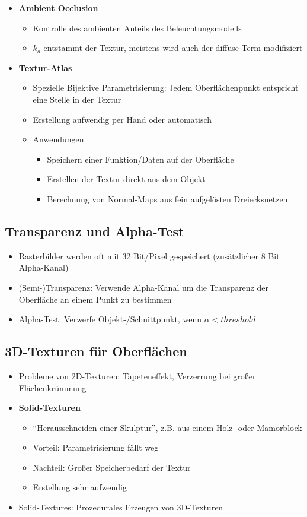 \begin{itemize}
	\item \textbf{Ambient Occlusion}
	\begin{itemize}
		\item Kontrolle des ambienten Anteils des Beleuchtungsmodells
		\item \(k_a\) entstammt der Textur, meistens wird auch der diffuse Term modifiziert
	\end{itemize}
	\item \textbf{Textur-Atlas}
	\begin{itemize}
		\item Spezielle Bijektive Parametrisierung: Jedem Oberflächenpunkt entspricht eine Stelle in der Textur
		\item Erstellung aufwendig per Hand oder automatisch
		\item Anwendungen
		\begin{itemize}
			\item Speichern einer Funktion/Daten auf der Oberfläche
			\item Erstellen der Textur direkt aus dem Objekt
			\item Berechnung von Normal-Maps aus fein aufgelösten Dreiecksnetzen
		\end{itemize}
	\end{itemize}
\end{itemize}


\subsection{Transparenz und Alpha-Test}
\begin{itemize}
	\item Rasterbilder werden oft mit 32 Bit/Pixel gespeichert (zusätzlicher 8 Bit Alpha-Kanal)
	\item (Semi-)Transparenz: Verwende Alpha-Kanal um die Transparenz der Oberfläche an einem Punkt zu bestimmen
	\item Alpha-Test: Verwerfe Objekt-/Schnittpunkt, wenn \(\alpha < threshold\)
\end{itemize}


\subsection{3D-Texturen für Oberflächen}
\begin{itemize}
	\item Probleme von 2D-Texturen: Tapeteneffekt, Verzerrung bei großer Flächenkrümmung
	\item \textbf{Solid-Texturen}
	\begin{itemize}
		\item "`Herausschneiden einer Skulptur"', z.B. aus einem Holz- oder Mamorblock
		\item Vorteil: Parametrisierung fällt weg
		\item Nachteil: Großer Speicherbedarf der Textur
		\item Erstellung sehr aufwendig
	\end{itemize}
	\item Solid-Textures: Prozedurales Erzeugen von 3D-Texturen
\end{itemize}


